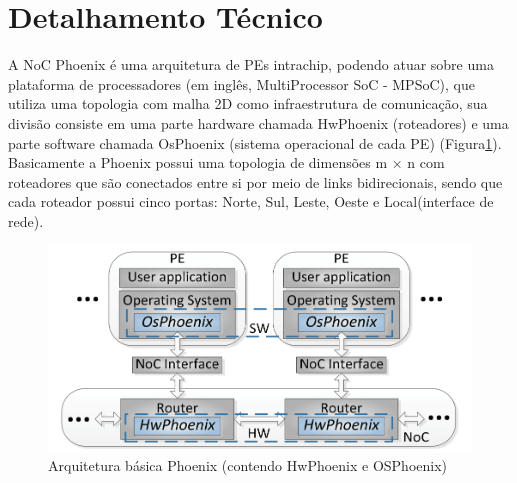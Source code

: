 \documentclass[conference]{IEEEtran}
\begin{document}
	
	\section{Detalhamento Técnico}
	A NoC Phoenix \cite{b7} é uma arquitetura de PEs intrachip, podendo atuar sobre uma plataforma de processadores (em inglês, MultiProcessor SoC - MPSoC), que utiliza uma topologia com malha 2D como infraestrutura de comunicação, sua divisão consiste em uma parte hardware chamada HwPhoenix (roteadores) e uma parte software chamada OsPhoenix (sistema operacional de cada PE)  (Figura\ref{ArquiteturaBasica}). Basicamente a Phoenix possui uma topologia de  dimensões m × n com roteadores que são conectados entre si por meio de links bidirecionais, sendo que cada roteador possui cinco portas: Norte, Sul, Leste, Oeste e Local(interface de rede).\\
	
	\begin{figure}[htbp]
		\centerline{\includegraphics[scale=0.365]{fig1.jpg}}
		\caption{Arquitetura básica Phoenix (contendo HwPhoenix e OSPhoenix)}
		\label{ArquiteturaBasica}
	\end{figure}
	
\end{document}
